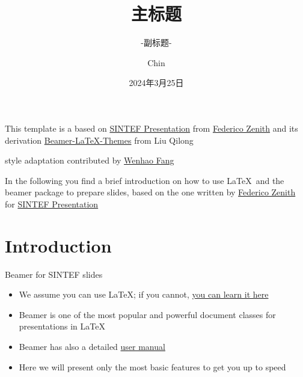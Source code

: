 \documentclass{beamer}
\title{主标题}
\subtitle{-副标题-}
\author{Chin}
\date{2024年3月25日}
\newcommand{\hrefcol}[2]{\textcolor{cyan}{\href{#1}{#2}}}
\begin{document}
\maketitle

\begin{frame}

This template is a based on \hrefcol{https://www.overleaf.com/latex/templates/sintef-presentation/jhbhdffczpnx}{SINTEF Presentation} from \hrefcol{mailto:federico.zenith@sintef.no}{Federico Zenith} and its derivation \hrefcol{https://github.com/TOB-KNPOB/Beamer-LaTeX-Themes}{Beamer-LaTeX-Themes} from Liu Qilong

\vspace{\baselineskip}

 style adaptation contributed by \hrefcol{https://github.com/FangWHao}{Wenhao Fang}

\vspace{\baselineskip}

In the following you find a brief introduction on how to use \LaTeX\ and the beamer package to prepare slides, based on the one written by \hrefcol{mailto:federico.zenith@sintef.no}{Federico Zenith} for \hrefcol{https://www.overleaf.com/latex/templates/sintef-presentation/jhbhdffczpnx}{SINTEF Presentation}


\end{frame}

\section{Introduction}

\begin{frame}{Beamer for SINTEF slides}
\begin{itemize}
\item We assume you can use \LaTeX; if you cannot,
\hrefcol{http://en.wikibooks.org/wiki/LaTeX/}{you can learn it here}
\item Beamer is one of the most popular and powerful document
classes for presentations in \LaTeX
\item Beamer has also a detailed
\hrefcol{http://www.ctan.org/tex-archive/macros/latex/contrib/beamer/doc/beameruserguide.pdf}{user
 manual}
\item Here we will present only the most basic features to get you up to speed
\end{itemize}
\end{frame}
\end{document}
